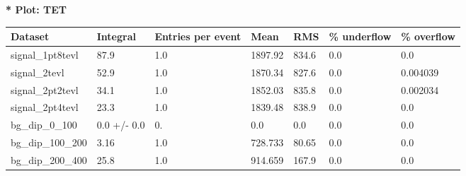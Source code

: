 \documentclass[a4paper, 10pt]{article}
\begin{document}
\textbf{* Plot: TET}\\
   \begin{table}[H]
  \begin{center}
    \begin{tabular}{|m{23.0mm}|m{23.0mm}|m{18.0mm}|m{19.0mm}|m{19.0mm}|m{19.0mm}|m{19.0mm}|}
      \hline
      {\cellcolor{yellow}         Dataset}& {\cellcolor{yellow}         Integral}& {\cellcolor{yellow}         Entries per event}& {\cellcolor{yellow}         Mean}& {\cellcolor{yellow}         RMS}& {\cellcolor{yellow}         \% underflow}& {\cellcolor{yellow}         \% overflow}\\
      \hline
      {\cellcolor{white}         signal\_1pt8tevl}& {\cellcolor{white}         87.9}& {\cellcolor{white}         1.0}& {\cellcolor{white}         1897.92}& {\cellcolor{white}         834.6}& {\cellcolor{green}         0.0}& {\cellcolor{green}         0.0}\\
      \hline
      {\cellcolor{white}         signal\_2tevl}& {\cellcolor{white}         52.9}& {\cellcolor{white}         1.0}& {\cellcolor{white}         1870.34}& {\cellcolor{white}         827.6}& {\cellcolor{green}         0.0}& {\cellcolor{green}         0.004039}\\
      \hline
      {\cellcolor{white}         signal\_2pt2tevl}& {\cellcolor{white}         34.1}& {\cellcolor{white}         1.0}& {\cellcolor{white}         1852.03}& {\cellcolor{white}         835.8}& {\cellcolor{green}         0.0}& {\cellcolor{green}         0.002034}\\
      \hline
      {\cellcolor{white}         signal\_2pt4tevl}& {\cellcolor{white}         23.3}& {\cellcolor{white}         1.0}& {\cellcolor{white}         1839.48}& {\cellcolor{white}         838.9}& {\cellcolor{green}         0.0}& {\cellcolor{green}         0.0}\\
      \hline
      {\cellcolor{white}         bg\_dip\_0\_100}& {\cellcolor{white}         0.0 +/\-- 0.0}& {\cellcolor{white}         0.}& {\cellcolor{white}         0.0}& {\cellcolor{white}         0.0}& {\cellcolor{green}         0.0}& {\cellcolor{green}         0.0}\\
      \hline
      {\cellcolor{white}         bg\_dip\_100\_200}& {\cellcolor{white}         3.16}& {\cellcolor{white}         1.0}& {\cellcolor{white}         728.733}& {\cellcolor{white}         80.65}& {\cellcolor{green}         0.0}& {\cellcolor{green}         0.0}\\
      \hline
      {\cellcolor{white}         bg\_dip\_200\_400}& {\cellcolor{white}         25.8}& {\cellcolor{white}         1.0}& {\cellcolor{white}         914.659}& {\cellcolor{white}         167.9}& {\cellcolor{green}         0.0}& {\cellcolor{green}         0.0}\\

\end{tabular}
\end{center}
\end{table}
\end{document}
